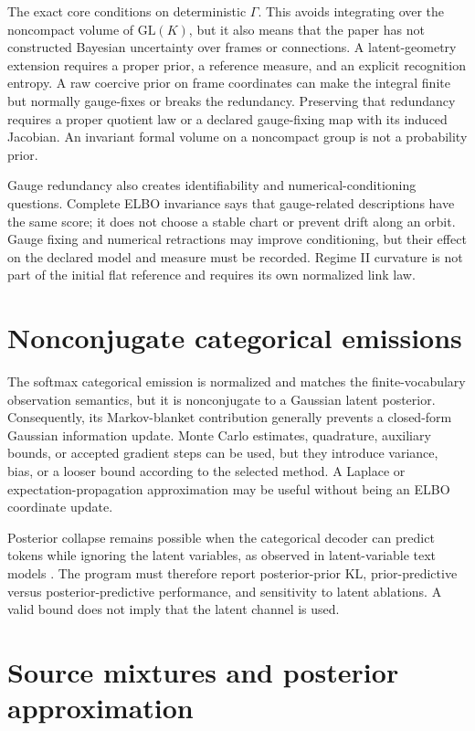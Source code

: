 The exact core conditions on deterministic $\Gamma$. This avoids integrating over the noncompact volume of $\mathrm{GL}(K)$, but it also means that the paper has not constructed Bayesian uncertainty over frames or connections. A latent-geometry extension requires a proper prior, a reference measure, and an explicit recognition entropy. A raw coercive prior on frame coordinates can make the integral finite but normally gauge-fixes or breaks the redundancy. Preserving that redundancy requires a proper quotient law or a declared gauge-fixing map with its induced Jacobian. An invariant formal volume on a noncompact group is not a probability prior.

Gauge redundancy also creates identifiability and numerical-conditioning questions. Complete ELBO invariance says that gauge-related descriptions have the same score; it does not choose a stable chart or prevent drift along an orbit. Gauge fixing and numerical retractions may improve conditioning, but their effect on the declared model and measure must be recorded. Regime II curvature is not part of the initial flat reference and requires its own normalized link law.

\section{Nonconjugate categorical emissions}

The softmax categorical emission is normalized and matches the finite-vocabulary observation semantics, but it is nonconjugate to a Gaussian latent posterior. Consequently, its Markov-blanket contribution generally prevents a closed-form Gaussian information update. Monte Carlo estimates, quadrature, auxiliary bounds, or accepted gradient steps can be used, but they introduce variance, bias, or a looser bound according to the selected method. A Laplace or expectation-propagation approximation may be useful without being an ELBO coordinate update.

Posterior collapse remains possible when the categorical decoder can predict tokens while ignoring the latent variables, as observed in latent-variable text models \citep{bowman2016generating}. The program must therefore report posterior-prior KL, prior-predictive versus posterior-predictive performance, and sensitivity to latent ablations. A valid bound does not imply that the latent channel is used.

\section{Source mixtures and posterior approximation}

